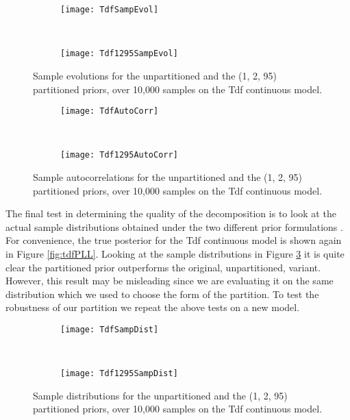 \begin{figure}[h]
    \centering
    \begin{subfigure}[t]{0.48\textwidth}
      \texttt{[image: TdfSampEvol]}
    \end{subfigure}
    ~
    \begin{subfigure}[t]{0.48\textwidth}
      \texttt{[image: Tdf1295SampEvol]}
    \end{subfigure}
    \caption{Sample evolutions for the unpartitioned and the (1, 2, 95) partitioned priors, over 10,000 samples on the Tdf continuous model.}
    \label{fig:tdfPSampEvol}
\end{figure}

\begin{figure}[h]
    \centering
    \begin{subfigure}[t]{0.48\textwidth}
      \texttt{[image: TdfAutoCorr]}
    \end{subfigure}
    ~
    \begin{subfigure}[t]{0.48\textwidth}
      \texttt{[image: Tdf1295AutoCorr]}
    \end{subfigure}
    \caption{Sample autocorrelations for the unpartitioned and the (1, 2, 95) partitioned priors, over 10,000 samples on the Tdf continuous model.}
    \label{fig:tdfPAutoCorr}
\end{figure}

The final test in determining the quality of the decomposition is to look at the actual sample distributions obtained under the two different prior formulations . For convenience, the true posterior for the Tdf continuous model is shown again in Figure \ref{fig:tdfPLL}. Looking at the sample distributions in Figure \ref{fig:tdfPDist} it is quite clear the partitioned prior outperforms the original, unpartitioned, variant. However, this result may be misleading since we are evaluating it on the same distribution which we used to choose the form of the partition. To test the robustness of our partition we repeat the above tests on a new model.

\begin{figure}[h]
    \centering
    \begin{subfigure}[t]{0.48\textwidth}
      \texttt{[image: TdfSampDist]}
    \end{subfigure}
    ~
    \begin{subfigure}[t]{0.48\textwidth}
      \texttt{[image: Tdf1295SampDist]}
    \end{subfigure}
    \caption{Sample distributions for the unpartitioned and the (1, 2, 95) partitioned priors, over 10,000 samples on the Tdf continuous model.}
    \label{fig:tdfPDist}
\end{figure}

